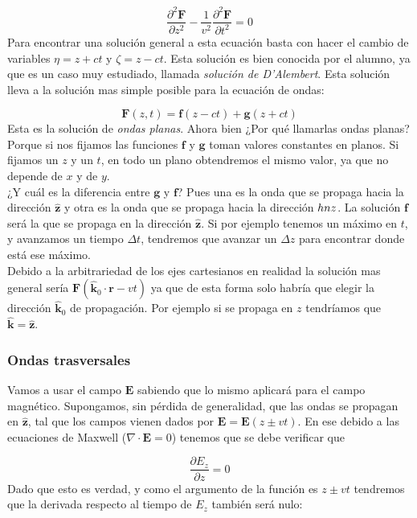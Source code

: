 \documentclass[12pt,a4paper]{article}
\newcommand{\parciales}[2]{\frac{\partial #1}{\partial #2}}
\newcommand{\dive}{\nabla \cdot}
\newcommand{\En}{\mathbf{E}}
\newcommand{\Fn}{\mathbf{F}}
\newcommand{\fn}{\mathbf{f}}
\newcommand{\rn}{\mathbf{r}}
\newcommand{\gn}{\mathbf{g}}
\newcommand{\hnz}{\hat{\mathbf{z}}}
\newcommand{\hnk}{\hat{\mathbf{k}}}
\numberwithin{equation}{section}
\numberwithin{figure}{section}
\begin{document}
\begin{equation}
\dfrac{\partial^2 \Fn}{\partial z^2} - \dfrac{1}{v^2} \dfrac{\partial^2 \Fn}{\partial t^2} = 0  
\end{equation}
Para encontrar una solución general a esta ecuación basta con hacer el cambio de variables $\eta = z + ct$ y $\zeta = z - ct$. Esta solución es bien conocida por el alumno, ya que es un caso muy estudiado, llamada \textit{solución de D'Alembert}. Esta solución lleva a la solución mas simple posible para la ecuación de ondas:

\begin{equation}
\Fn (z,t) = \fn (z-ct) + \gn(z+ct)
\end{equation}
Esta es la solución de \textit{ondas planas}. Ahora bien ¿Por qué llamarlas ondas planas? Porque si nos fijamos las funciones $\fn$ y $\gn$ toman valores constantes en planos. Si fijamos un $z$ y un $t$, en todo un plano obtendremos el mismo valor, ya que no depende de $x$ y de $y$. \\

 ¿Y cuál es la diferencia entre $\gn$ y $\fn$? Pues una es la onda que se propaga hacia la dirección $\hnz$ y otra es la onda  que se propaga hacia la dirección $\-hnz$. La solución $\fn$ será la que se propaga en la dirección $\hnz$. Si por ejemplo tenemos un máximo en $t$, y avanzamos un tiempo $\Delta t$, tendremos que avanzar un $\Delta z$ para encontrar donde está ese máximo.  \\
 
Debido a la arbitrariedad de los ejes cartesianos en realidad la solución mas general sería $\Fn ( \hnk_0 \cdot \rn - vt)$ ya que de esta forma solo habría que elegir la dirección $\hnk_0$ de propagación. Por ejemplo si se propaga en $z$ tendríamos que $\hnk=\hnz$. \\

\subsubsection{Ondas trasversales}

Vamos a usar el campo $\En$ sabiendo que lo mismo aplicará para el campo magnético. Supongamos, sin pérdida de generalidad, que las ondas se propagan en $\hnz$, tal que los campos vienen dados por $\En = \En (z \pm v t)$. En ese debido a las ecuaciones de Maxwell ($\dive \En = 0$) tenemos que se debe verificar que

\begin{equation} 
\parciales{E_z}{z} = 0
\end{equation}
Dado que esto es verdad, y como el argumento de la función es $z\pm vt$ tendremos que la derivada respecto al tiempo de $E_z$ también será nulo:
\end{document}
